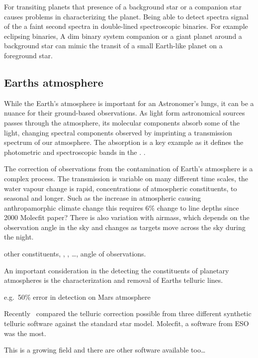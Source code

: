 For transiting planets that presence of a background star or a companion star causes problems in characterizing the planet. Being able to detect spectra signal of the a faint second spectra in double-lined spectroscopic binaries.
For example eclipsing binaries,
A dim binary system companion or a giant planet around a background star can mimic the transit of a small Earth-like planet on a foreground star.






\subsection{Earths atmosphere}
While the Earth's atmosphere is important for an Astronomer's lungs, it can be a nuance for their ground-based observations. As light form astronomical sources passes through the atmosphere, its molecular components absorb some of the light, changing spectral components observed by imprinting a transmission spectrum of our atmosphere. The  absorption is a key example as it defines the photometric and spectroscopic bands in the \nir{}. .

The correction of observations from the contamination of Earth's atmosphere is a complex process. The transmission is variable on many different time scales, the water vapour change is rapid, concentrations of atmospheric constituents, to seasonal and longer. Such as the increase in atmospheric  causing anthropamorphic climate change this requires 6\% change to  line depths since 2000 Molecfit paper? There is also variation with airmass, which depends on the observation angle in the sky and changes as targets move across the sky during the night.

other constituents, , ,  \ldots{}, angle of observations.

An important consideration in the detecting the constituents of planetary atmospheres is the characterization and removal of Earths telluric lines.

e.g.\ 50\% error in  detection on Mars atmosphere


Recently~\citet{ulmer-moll_telluric_2018} compared the telluric correction possible from three different synthetic telluric software against the standard star model. Molecfit, a software from ESO was the most.

This is a growing field and there are other software available too\ldots{}


